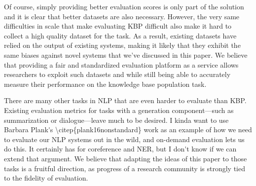 Of course, simply providing better evaluation scores is only part of the solution and it is clear that better datasets are also necessary.
However, the very same difficulties in scale that make evaluating KBP difficult also make it hard to collect a high quality dataset for the task.
As a result, existing datasets \citep{angeli2014combining,adel2016comparing} have relied on the output of existing systems, making it likely that they exhibit the same biases against novel systems that we've discussed in this paper.
We believe that providing a fair and standardized evaluation platform as a service
allows researchers to exploit such datasets and while still being able to accurately measure their performance on the knowledge base population task.

There are many other tasks in NLP that are even harder to evaluate than KBP.\@
Existing evaluation metrics for tasks with a generation component---such as summarization or dialogue---leave much to be desired.
\ac{I kinda want to use Barbara Plank's \citep{plank16nonstandard} work as an example of how we need to evaluate our NLP systems out in the wild, and on-demand evaluation lets us do this. It certainly has for coreference and NER, but I don't know if we can extend that argument.}
We believe that adapting the ideas of this paper to those tasks is a fruitful direction,
as progress of a research community is strongly tied to the fidelity of evaluation.
